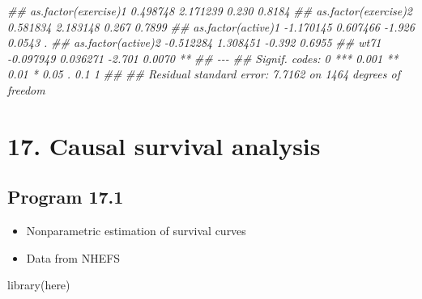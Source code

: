 \documentclass[
  10pt,
  a4paper,
]{book}
\newenvironment{Shaded}{\begin{snugshade}}{\end{snugshade}}
\newcommand{\DocumentationTok}[1]{\textcolor[rgb]{0.37,0.37,0.37}{\textit{#1}}}
\newcommand{\FunctionTok}[1]{\textcolor[rgb]{0.28,0.35,0.67}{#1}}
\newcommand{\NormalTok}[1]{\textcolor[rgb]{0.00,0.46,0.62}{#1}}
\providecommand{\tightlist}{%
  \setlength{\itemsep}{0pt}\setlength{\parskip}{0pt}}
\begin{document}
\begin{Shaded}
\begin{Highlighting}[]
\DocumentationTok{\#\# as.factor(exercise)1  0.498748   2.171239   0.230   0.8184    }
\DocumentationTok{\#\# as.factor(exercise)2  0.581834   2.183148   0.267   0.7899    }
\DocumentationTok{\#\# as.factor(active)1   {-}1.170145   0.607466  {-}1.926   0.0543 .  }
\DocumentationTok{\#\# as.factor(active)2   {-}0.512284   1.308451  {-}0.392   0.6955    }
\DocumentationTok{\#\# wt71                 {-}0.097949   0.036271  {-}2.701   0.0070 ** }
\DocumentationTok{\#\# {-}{-}{-}}
\DocumentationTok{\#\# Signif. codes:  0 \textquotesingle{}***\textquotesingle{} 0.001 \textquotesingle{}**\textquotesingle{} 0.01 \textquotesingle{}*\textquotesingle{} 0.05 \textquotesingle{}.\textquotesingle{} 0.1 \textquotesingle{} \textquotesingle{} 1}
\DocumentationTok{\#\# }
\DocumentationTok{\#\# Residual standard error: 7.7162 on 1464 degrees of freedom}
\end{Highlighting}
\end{Shaded}

\hypertarget{causal-survival-analysis}{%
\chapter*{17. Causal survival analysis}\label{causal-survival-analysis}}

\hypertarget{program-17.1}{%
\section{Program 17.1}\label{program-17.1}}

\begin{itemize}
\tightlist
\item
  Nonparametric estimation of survival curves
\item
  Data from NHEFS
\end{itemize}

\begin{Shaded}
\begin{Highlighting}[]
\FunctionTok{library}\NormalTok{(here)}
\end{Highlighting}
\end{Shaded}
\end{document}
